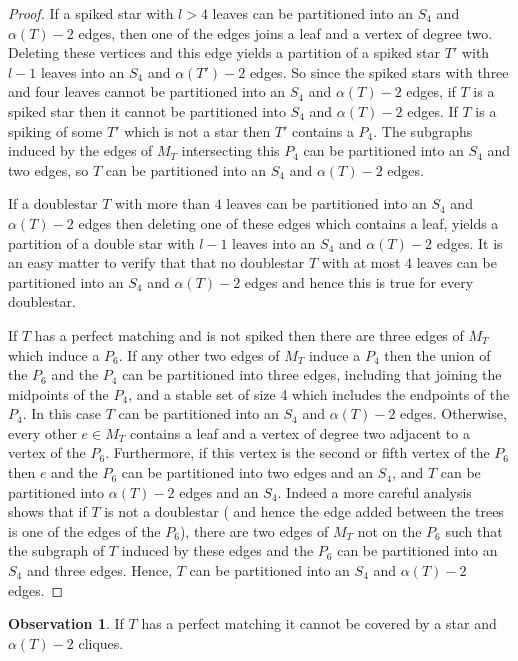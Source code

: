 \documentclass[12pt]{article}
\theoremstyle{definition}
\newtheorem{observation}[theorem]{\textbf{Observation}}
\begin{document}
\begin{proof}
If a spiked star with $l>4$ leaves can be partitioned  into an $S_4$ and $\alpha(T)-2$  edges, then  one of the edges joins  a leaf and a vertex of degree two.  Deleting these vertices and this edge yields a partition of a spiked star $T'$ with $l-1$ leaves into an $S_4$ and $\alpha(T')-2$ edges. So since the spiked stars with three and four 
leaves cannot be partitioned into an $S_4$ and $\alpha(T)-2$ edges, if $T$ is a  spiked star  then it cannot be partitioned into $S_4$ and  $\alpha(T)-2$ edges. 
If $T$ is a spiking of some $T'$ which is not a star then  $T'$ contains a $P_4$. The subgraphs induced by the  edges of $M_T$ 
intersecting this $P_4$ can be partitioned into an $S_4$ and two edges, so $T$ can be partitioned into an $S_4$ and $\alpha(T)-2$
edges. 

If a doublestar   $T$ with more than  $4$  leaves can be partitioned into an $S_4$ and $\alpha(T)-2$ edges then deleting
one of these edges  which contains a leaf, yields a partition of a double star with $l-1$ leaves into an $S_4$ and $\alpha(T)-2$ edges.
It is an easy matter to verify that that no doublestar $T$ with at most $4$ leaves can be partitioned into   an $S_4$ and $\alpha(T)-2$ edges and hence this is true for every doublestar.  


If $T$ has a perfect matching  and is not spiked then there are three  edges  of $M_T$ which induce a  $P_6$. If any other two edges of $M_T$  induce a 
$P_4$ then the union of the $P_6$ and the $P_4$ can be partitioned into three edges, including that joining the midpoints 
of the $P_4$, and a stable set of size 4 which includes  the endpoints of the $P_4$. In this case $T$ can be partitioned into 
an $S_4$ and $\alpha(T)-2$ edges. Otherwise, every other $e \in M_T$ contains a leaf and a vertex of degree two adjacent 
to a vertex of the $P_6$. Furthermore, if this vertex is the second or fifth vertex  of the $P_6$ then $e$ and the $P_6$ can 
be partitioned into two edges and an $S_4$, and $T$ can be partitioned into $\alpha(T)-2$ edges and an $S_4$.
Indeed a more careful analysis shows that if $T$ is not a  doublestar ( and hence the edge added between the trees is one of the edges of the $P_6$), there are two edges of $M_T$ not on the $P_6$ such that the subgraph of $T$ induced by these edges and the $P_6$ can be partitioned into an $S_4$ and three edges. Hence, $T$ can be partitioned into an $S_4$ and $\alpha(T)-2$ edges. 
\end{proof}


\begin{observation}\label{star}
 If $T$ has a perfect matching it cannot  be covered by a star and $\alpha(T)-2$ cliques. 
\end{observation}
\end{document}
